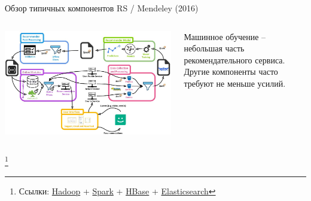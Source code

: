 \documentclass[11pt,aspectratio=169]{beamer}
\begin{document}
\begin{frame}{Обзор типичных компонентов RS / Mendeley (2016) \cite{MNDL}}
\begin{columns}
\begin{column}{0.6\textwidth}
   \begin{center}
		\includegraphics[scale=0.2]{images/mendeley.jpeg}
   \end{center}
\end{column}
\begin{column}{0.35\textwidth}
    \begin{tcolorbox}[colback=info!5,colframe=info!80,title=]
    \begin{small}
    Машинное обучение -- небольшая часть рекомендательного сервиса. Другие компоненты часто требуют не меньше усилий.
    \end{small}
    \end{tcolorbox}
\end{column}
\end{columns}

\footnote{Ссылки:
\href{https://hadoop.apache.org/}{Hadoop} +
\href{https://spark.apache.org/}{Spark} +
\href{https://hbase.apache.org/}{HBase} +
\href{https://www.elastic.co/what-is/elasticsearch}{Elasticsearch}
}

\end{frame}
\end{document}
